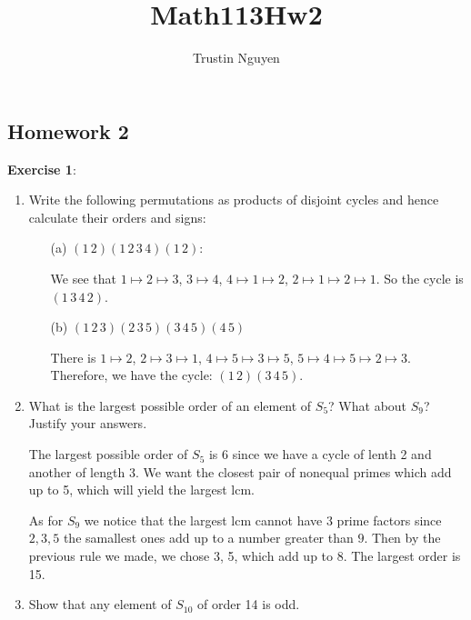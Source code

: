 \documentclass{article}
\title{Math113Hw2}
\author{Trustin Nguyen}
\begin{document}
\maketitle
\reversemarginpar

\begin{topic}
	\section*{Homework 2}
\end{topic}

\textbf{Exercise 1}: 
\begin{enumerate}
	\item Write the following permutations as products of disjoint cycles and hence calculate their orders and signs:
		\begin{enumerate}
			\item [(a)] $(1 \, 2)(1 \, 2 \, 3 \, 4)(1 \, 2)$:

				We see that $1 \mapsto 2 \mapsto 3$, $3 \mapsto 4$, $4 \mapsto 1 \mapsto 2$, $2 \mapsto 1\mapsto 2\mapsto 1$. So the cycle is $(1 \, 3 \, 4 \, 2)$.

			\item [(b)] $(1 \, 2 \, 3)(2 \, 3 \, 5)(3 \, 4 \, 5) (4 \, 5)$

				There is $1 \mapsto 2$, $2\mapsto 3 \mapsto 1$, $4 \mapsto 5\mapsto 3 \mapsto 5$, $5 \mapsto 4 \mapsto 5 \mapsto 2 \mapsto 3$. Therefore, we have the cycle: $(1 \, 2)(3 \, 4 \, 5)$. 
		\end{enumerate}
	\item What is the largest possible order of an element of $S_{5}$? What about $S_{9}$? Justify your answers.

		The largest possible order of $S_{5}$ is 6 since we have a cycle of lenth 2 and another of length 3. We want the closest pair of nonequal primes which add up to 5, which will yield the largest lcm. 

		As for $S_{9}$ we notice that the largest lcm cannot have 3 prime factors since $2, 3, 5$ the samallest ones add up to a number greater than $9$. Then by the previous rule we made, we chose 3, 5, which add up to 8. The largest order is 15.

	\item Show that any element of $S_{10}$ of order 14 is odd. 


\end{enumerate}
\end{document}
